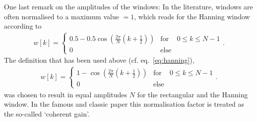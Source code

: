 \documentclass[11pt,a4paper,DIV=12]{scrartcl}
\begin{document}
One last remark on the amplitudes of the windows: In the literature, windows
are often normalised to a maximum value $=1$, which reads for
the Hanning window according to \cite{Moeser2011}
%
\begin{align}
w[k]=\left\{\begin{matrix}0.5-0.5\cos\left(\frac{2\pi}{N}\left(k+\frac{1}{2}\right)\right) & \text{for} & 0\leq k\leq N-1\\0 & \text{else} &\end{matrix}\right..
\end{align}
%
The definition that has been used above (cf. eq.~\eqref{eq:hanning}),
\begin{align}
w[k]=\left\{\begin{matrix}1-\cos\left(\frac{2\pi}{N}\left(k+\frac{1}{2}\right)\right) & \text{for} & 0\leq k\leq N-1\\0 & \text{else} &\end{matrix}\right..
\end{align}
was chosen to result in equal amplitudes $N$ for the rectangular and the Hanning
window.
%
In the famous and classic paper \cite[tab.~1]{Harris1978} this normalisation
factor is treated as the so-called `coherent gain'.

\end{document}
